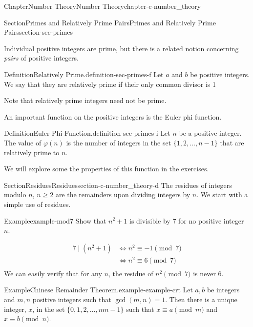 \documentclass[oneside,10pt,]{book}
\numberwithin{equation}{section}
\begin{document}
\begin{chapterptx}{Chapter}{Number Theory}{}{Number Theory}{}{}{chapter-c-number_theory}
\begin{sectionptx}{Section}{Primes and Relatively Prime Pairs}{}{Primes and Relatively Prime Pairs}{}{}{section-sec-primes}
\par
Individual positive integers are prime, but there is a related notion concerning \emph{pairs} of positive integers.%
\begin{definition}{Definition}{Relatively Prime.}{definition-sec-primes-f}%
%
Let \(a\) and \(b\) be positive integers.  We say that they are relatively prime if their only common divisor is 1%
\end{definition}
Note that relatively prime integers need not be prime.%
\par
An important function on the positive integers is the Euler phi function.%
\begin{definition}{Definition}{Euler Phi Function.}{definition-sec-primes-i}%
%
%
\label{notation-sec-primes-i-d}%
Let \(n\) be a positive integer. The value of \(\varphi(n)\) is the number of integers in the set \(\{1, 2,\dots ,n-1\}\) that are relatively prime to \(n\).%
\end{definition}
We will explore some the properties of this function in the exercises.%
\end{sectionptx}
%
%
\typeout{************************************************}
\typeout{************************************************}
%
\begin{sectionptx}{Section}{Residues}{}{Residues}{}{}{section-c-number_theory-d}
The residues of integers modulo \(n\), \(n \geq 2\) are the remainders upon dividing integers by \(n\).  We start with a simple use of residues.%
\begin{example}{Example}{}{example-mod7}%
Show that \(n^2+ 1\) is divisible by 7 for no positive integer \(n\).%
\par
%
\begin{equation*}
\begin{split}
7 \mid (n^2+1) & \Leftrightarrow n^2 \equiv -1\pmod{7}\\
& \Leftrightarrow n^2 \equiv  6\pmod{7}\\
\end{split}
\end{equation*}
We can easily verify that for any \(n\), the residue of \(n^2\pmod{7}\) is never 6.%
\end{example}
\begin{example}{Example}{Chinese Remainder Theorem.}{example-example-crt}%
%
Let \(a, b\) be integers and \(m, n\) positive integers such that \(\gcd (m,n)=1\). Then there is a unique integer, \(x\), in the set \(\{0,1,2,\ldots , m n -1\}\) such that \(x\equiv a \pmod{m}\) and \(x\equiv b\pmod{n}\).%

\end{example}
\end{sectionptx}
\end{chapterptx}
\end{document}

